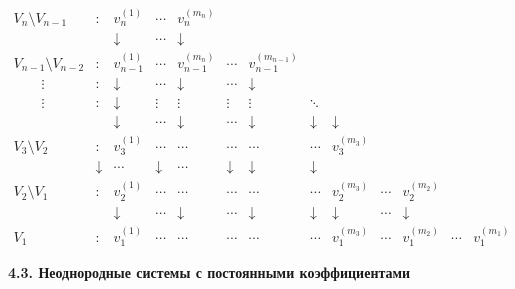 \documentclass[12pt,a4paper]{article}
\begin{document}
\begin{equation}\label{eq.jor-basis}
\begin{array}{lcccccccccccc}
V_n \setminus V_{n-1} & : \ & v_{n}^{(1)} & \cdots & v_{n}^{(m_n)} & {} & {}& {} & {} & {} & {} & {} & {}\\
{} & {} & \downarrow &  \cdots  & \downarrow & {} & {} & {} & {} & {} & {} & {} & {}\\
V_{n-1} \setminus V_{n-2} & : \ & v_{n-1}^{(1)} & \cdots & v_{n-1}^{(m_n)} & \cdots & v_{n-1}^{(m_{n-1})} & {} & {} & {} & {} & {}\\
\qquad \vdots & : & \downarrow & \cdots & \downarrow & \cdots & \downarrow & {} & {} & {} & {} & {}\\
\qquad \vdots &  :  & \downarrow & \vdots &  \vdots & \vdots & \vdots & \ddots & {} & {} & {} & {}& {} \\
{} & {} & \downarrow & \cdots & \downarrow & \cdots & \downarrow & \downarrow &  \downarrow & {} & {} & {} & {} \\
V_3 \setminus V_2 & : \ & v_3^{(1)} &  \cdots & \cdots & \cdots & \cdots & \cdots & v_3^{(m_3)} & {} & {} & {} & {}\\
{} & \downarrow & \cdots & \downarrow & \cdots & \downarrow & \downarrow & \downarrow & {} & {} & {} & {}\\
V_2 \setminus V_1 & : \ & v_2^{(1)} &  \cdots & \cdots & \cdots & \cdots & \cdots & v_2^{(m_3)} & \cdots & v_2^{(m_2)} & {} & {}\\
{} & {} & \downarrow & \cdots & \downarrow & \cdots & \downarrow & \downarrow & \downarrow & \cdots & \downarrow & {} & {}\\
V_1  & : \ & v_1^{(1)} & \cdots & \cdots &  \cdots & \cdots & \cdots & v_1^{(m_3)}  & \cdots & v_1^{(m_2)} & \cdots & v_1^{(m_1)}
 \end{array}
\end{equation}
\medskip

\begin{center}
\textbf{4.3. Неоднородные системы с постоянными коэффициентами}
\end{center}
\smallskip
\end{document}
